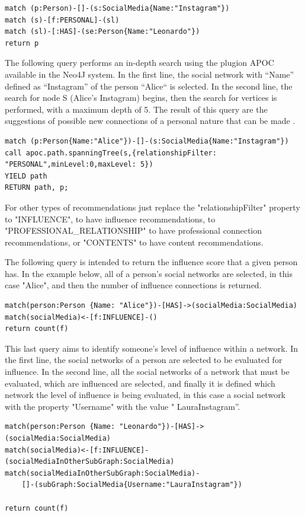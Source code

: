 \begin{verbatim}
match (p:Person)-[]-(s:SocialMedia{Name:"Instagram"})
match (s)-[f:PERSONAL]-(sl)
match (sl)-[:HAS]-(se:Person{Name:"Leonardo"})
return p
\end{verbatim}

The following query performs an in-depth search using the plugion APOC \cite{apoc} available in the Neo4J system. In the first line, the social network with “Name” defined as “Instagram” of the person “Alice“ is selected. In the second line, the search for node S (Alice's Instagram) begins, then the search for vertices is performed, with a maximum depth of 5. The result of this query are the suggestions of possible new connections of a personal nature that can be made .

\begin{verbatim}
match (p:Person{Name:"Alice"})-[]-(s:SocialMedia{Name:"Instagram"})
call apoc.path.spanningTree(s,{relationshipFilter: "PERSONAL",minLevel:0,maxLevel: 5})
YIELD path
RETURN path, p;
\end{verbatim}

For other types of recommendations just replace the "relationshipFilter" property to "INFLUENCE", to have influence recommendations, to "PROFESSIONAL\_RELATIONSHIP" to have professional connection recommendations, or "CONTENTS" to have content recommendations.


The following query is intended to return the influence score that a given person has. In the example below, all of a person's social networks are selected, in this case "Alice", and then the number of influence connections is returned.

\begin{verbatim}
match(person:Person {Name: "Alice"})-[HAS]->(socialMedia:SocialMedia)
match(socialMedia)<-[f:INFLUENCE]-()
return count(f)
\end{verbatim}


This last query aims to identify someone's level of influence within a network. In the first line, the social networks of a person are selected to be evaluated for influence. In the second line, all the social networks of a network that must be evaluated, which are influenced are selected, and finally it is defined which network the level of influence is being evaluated, in this case a social network with the property "Username" with the value " LauraInstagram”.
\begin{verbatim}
match(person:Person {Name: "Leonardo"})-[HAS]->(socialMedia:SocialMedia)
match(socialMedia)<-[f:INFLUENCE]-(socialMediaInOtherSubGraph:SocialMedia)
match(socialMediaInOtherSubGraph:SocialMedia)-
    []-(subGraph:SocialMedia{Username:"LauraInstagram"})

return count(f)
\end{verbatim}





